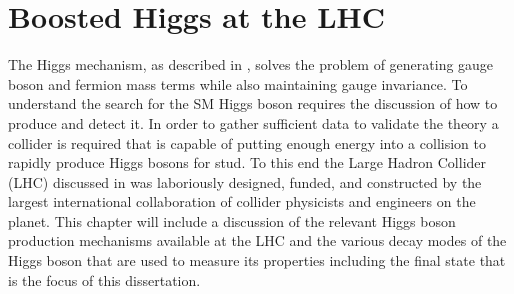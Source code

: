 \chapter{Boosted Higgs at the LHC} \label{chap:higgs}

The Higgs mechanism, as described in , solves the
problem of generating gauge boson and fermion mass terms while also maintaining
gauge invariance.  To understand the search for the SM Higgs boson requires the
discussion of how to produce and detect it.  In order to gather sufficient data
to validate the theory a collider is required that is capable of putting enough
energy into a collision to rapidly produce Higgs bosons for stud.  To this end
the Large Hadron Collider (LHC) discussed in  was laboriously
designed, funded, and constructed by the largest international collaboration of
collider physicists and engineers on the planet. This chapter will include a
discussion of the relevant Higgs boson production mechanisms available at the
LHC and the various decay modes of the Higgs boson that are used to measure its
properties including the final state that is the focus of this dissertation.






